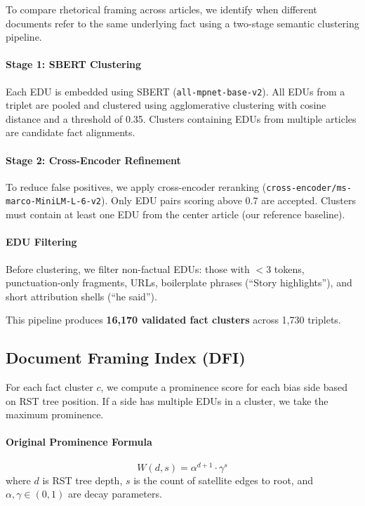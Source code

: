 \documentclass[11pt]{article}
\begin{document}
To compare rhetorical framing across articles, we identify when different documents refer to the same underlying fact using a two-stage semantic clustering pipeline.

\paragraph{Stage 1: SBERT Clustering}
Each EDU is embedded using SBERT (\texttt{all-mpnet-base-v2}). All EDUs from a triplet are pooled and clustered using agglomerative clustering with cosine distance and a threshold of 0.35. Clusters containing EDUs from multiple articles are candidate fact alignments.

\paragraph{Stage 2: Cross-Encoder Refinement}
To reduce false positives, we apply cross-encoder reranking (\texttt{cross-encoder/ms-marco-MiniLM-L-6-v2}). Only EDU pairs scoring above 0.7 are accepted. Clusters must contain at least one EDU from the center article (our reference baseline).

\paragraph{EDU Filtering}
Before clustering, we filter non-factual EDUs: those with $<3$ tokens, punctuation-only fragments, URLs, boilerplate phrases (``Story highlights''), and short attribution shells (``he said'').

This pipeline produces \textbf{16,170 validated fact clusters} across 1,730 triplets.

\subsection{Document Framing Index (DFI)}

For each fact cluster $c$, we compute a prominence score for each bias side based on RST tree position. If a side has multiple EDUs in a cluster, we take the maximum prominence.

\paragraph{Original Prominence Formula}
\begin{equation}
W(d, s) = \alpha^{d+1} \cdot \gamma^s
\end{equation}
where $d$ is RST tree depth, $s$ is the count of satellite edges to root, and $\alpha, \gamma \in (0,1)$ are decay parameters.
\end{document}
